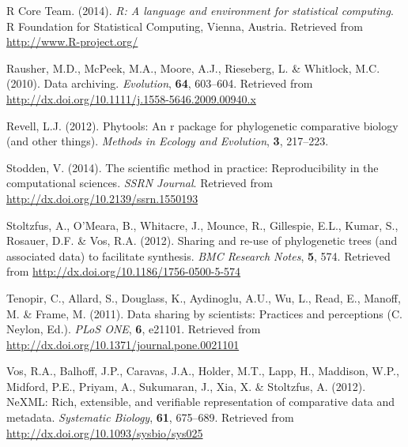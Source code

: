 \documentclass[author-year, review, 11pt]{components/elsarticle} %
\begin{document}
R Core Team. (2014). \emph{R: A language and environment for statistical
computing}. R Foundation for Statistical Computing, Vienna, Austria.
Retrieved from \url{http://www.R-project.org/}

Rausher, M.D., McPeek, M.A., Moore, A.J., Rieseberg, L. \& Whitlock,
M.C. (2010). Data archiving. \emph{Evolution}, \textbf{64}, 603--604.
Retrieved from \url{http://dx.doi.org/10.1111/j.1558-5646.2009.00940.x}

Revell, L.J. (2012). Phytools: An r package for phylogenetic comparative
biology (and other things). \emph{Methods in Ecology and Evolution},
\textbf{3}, 217--223.

Stodden, V. (2014). The scientific method in practice: Reproducibility
in the computational sciences. \emph{SSRN Journal}. Retrieved from
\url{http://dx.doi.org/10.2139/ssrn.1550193}

Stoltzfus, A., O'Meara, B., Whitacre, J., Mounce, R., Gillespie, E.L.,
Kumar, S., Rosauer, D.F. \& Vos, R.A. (2012). Sharing and re-use of
phylogenetic trees (and associated data) to facilitate synthesis.
\emph{BMC Research Notes}, \textbf{5}, 574. Retrieved from
\url{http://dx.doi.org/10.1186/1756-0500-5-574}

Tenopir, C., Allard, S., Douglass, K., Aydinoglu, A.U., Wu, L., Read,
E., Manoff, M. \& Frame, M. (2011). Data sharing by scientists:
Practices and perceptions (C. Neylon, Ed.). \emph{PLoS ONE}, \textbf{6},
e21101. Retrieved from
\url{http://dx.doi.org/10.1371/journal.pone.0021101}

Vos, R.A., Balhoff, J.P., Caravas, J.A., Holder, M.T., Lapp, H.,
Maddison, W.P., Midford, P.E., Priyam, A., Sukumaran, J., Xia, X. \&
Stoltzfus, A. (2012). NeXML: Rich, extensible, and verifiable
representation of comparative data and metadata. \emph{Systematic
Biology}, \textbf{61}, 675--689. Retrieved from
\url{http://dx.doi.org/10.1093/sysbio/sys025}
\end{document}
